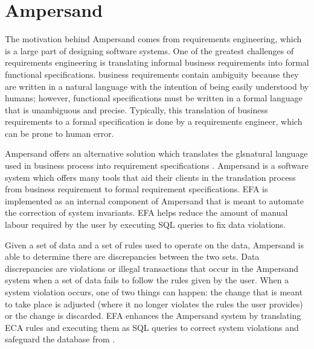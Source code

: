 \documentclass[journal,12pt,onecolumn,draftclsnofoot]{report}
\begin{document}
\section{Ampersand}


\indent
The motivation behind \gls{Ampersand} comes from \gls{requirements engineering}, which is a 
large part of designing software systems. One of the greatest challenges of 
\gls{requirements engineering} is translating informal \gls{business requirements} into 
formal \glspl{functional specification}. \gls{business requirements} contain ambiguity 
because they are written in a \gls{natural language} with the intention of being 
easily understood by humans; however,
\glspl{functional specification} must be written in a formal language that is 
unambiguous and precise. Typically, this translation of \gls{business requirements} 
to a formal specification is done by a requirements
engineer, which can be prone to human error.

\gls{Ampersand} offers an alternative solution which translates the gls{natural language} 
used in business process into requirement specifications
\cite{ruledesign}. 
\gls{Ampersand} is a 
software system which offers many tools that aid their clients in the 
translation process from business requirement to formal requirement 
specifications. EFA is implemented as an internal component of Ampersand that 
is meant to automate the correction of system invariants. EFA helps reduce the 
amount of manual labour required by the user by executing SQL queries to fix 
data violations. %

Given a set of data and a set of rules used to operate on the data, \gls{Ampersand} 
is able to determine  there are discrepancies between the two sets.
Data discrepancies are violations or illegal transactions
that occur in the \gls{Ampersand} system
when a set of data fails to follow the rules given by the user.
When a system violation occurs,
one of two things can happen: the change that is meant to 
take place is adjusted (where it no longer violates the rules the user 
provides) or the change is discarded. EFA enhances the \gls{Ampersand} system by 
translating \gls{ECA} rules and executing them as SQL queries to correct system 
violations and safeguard the database from .
\end{document}
